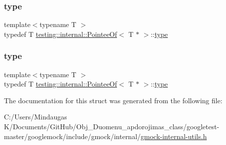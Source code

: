 \mbox{\label{structtesting_1_1internal_1_1_pointee_of_3_01_t_01_5_01_4_a91dde514cd3a8c07cedbe5336c36a55f}} 
\subsubsection{\texorpdfstring{type}{type}\hspace{0.1cm}{\footnotesize\ttfamily [2/3]}}
{\footnotesize\ttfamily template$<$typename T $>$ \\
typedef T \mbox{\hyperlink{structtesting_1_1internal_1_1_pointee_of}{testing\+::internal\+::\+Pointee\+Of}}$<$ T $\ast$ $>$\+::\mbox{\hyperlink{structtesting_1_1internal_1_1_pointee_of_3_01_t_01_5_01_4_a91dde514cd3a8c07cedbe5336c36a55f}{type}}}

\mbox{\label{structtesting_1_1internal_1_1_pointee_of_3_01_t_01_5_01_4_a91dde514cd3a8c07cedbe5336c36a55f}} 
\subsubsection{\texorpdfstring{type}{type}\hspace{0.1cm}{\footnotesize\ttfamily [3/3]}}
{\footnotesize\ttfamily template$<$typename T $>$ \\
typedef T \mbox{\hyperlink{structtesting_1_1internal_1_1_pointee_of}{testing\+::internal\+::\+Pointee\+Of}}$<$ T $\ast$ $>$\+::\mbox{\hyperlink{structtesting_1_1internal_1_1_pointee_of_3_01_t_01_5_01_4_a91dde514cd3a8c07cedbe5336c36a55f}{type}}}



The documentation for this struct was generated from the following file\+:\begin{DoxyCompactItemize}
\item 
C\+:/\+Users/\+Mindaugas K/\+Documents/\+Git\+Hub/\+Obj\+\_\+\+Duomenu\+\_\+apdorojimas\+\_\+class/googletest-\/master/googlemock/include/gmock/internal/\mbox{\hyperlink{googletest-master_2googlemock_2include_2gmock_2internal_2gmock-internal-utils_8h}{gmock-\/internal-\/utils.\+h}}\end{DoxyCompactItemize}
